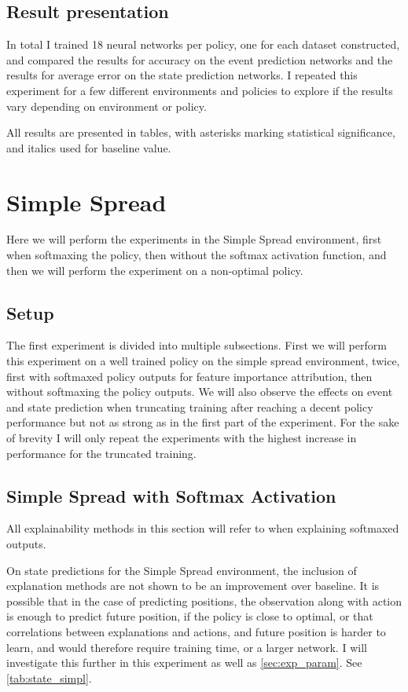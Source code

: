\documentclass[UKenglish]{uiomasterthesis}
\begin{document}
\subsection{Result presentation}
In total I trained 18 neural networks per policy, one for each dataset constructed, and compared the results for accuracy on the event prediction networks and the results for average error on the state prediction networks. I repeated this experiment for a few different environments and policies to explore if the results vary depending on environment or policy.

All results are presented in tables, with asterisks marking statistical significance, and italics used for baseline value.

\section{Simple Spread}
\label{sec:exp_simpl}
Here we will perform the experiments in the Simple Spread environment, first when softmaxing the policy, then without the softmax activation function, and then we will perform the experiment on a non-optimal policy.

\subsection{Setup}
The first experiment is divided into multiple subsections. First we will perform this experiment on a well trained policy on the simple spread environment, twice, first with softmaxed policy outputs for feature importance attribution, then without softmaxing the policy outputs. We will also observe the effects on event and state prediction when truncating training after reaching a decent policy performance but not as strong as in the first part of the experiment. For the sake of brevity I will only repeat the experiments with the highest increase in performance for the truncated training.

\subsection{Simple Spread with Softmax Activation}
All explainability methods in this section will refer to when explaining softmaxed outputs.


On state predictions for the Simple Spread environment, the inclusion of explanation methods are not shown to be an improvement over baseline. It is possible that in the case of predicting positions, the observation along with action is enough to predict future position, if the policy is close to optimal, or that correlations between explanations and actions, and future position is harder to learn, and would therefore require training time, or a larger network. I will investigate this further in this experiment as well as \cref{sec:exp_param}. See \cref{tab:state_simpl}. 
\end{document}
